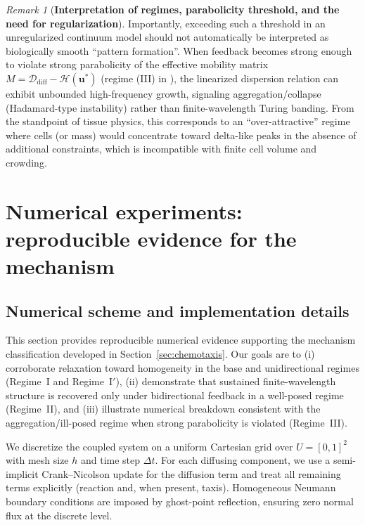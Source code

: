 \documentclass[pdflatex,sn-mathphys-ay]{sn-jnl}
\theoremstyle{thmstyleone}
\theoremstyle{definition}
\theoremstyle{remark}
\newtheorem{remark}[theorem]{Remark}
\begin{document}
\begin{remark}[\textbf{Interpretation of regimes, parabolicity threshold, and the need for regularization}]
Importantly, exceeding such a threshold in an unregularized continuum model should not automatically be interpreted as biologically smooth ``pattern formation''. 
When feedback becomes strong enough to violate strong parabolicity of the effective mobility matrix $M=\mathcal{D}_{\mathrm{diff}}-\mathcal{H}(\mathbf{u}^*)$ (regime (III) in ), the linearized dispersion relation can exhibit unbounded high-frequency growth, signaling aggregation/collapse (Hadamard-type instability) rather than finite-wavelength Turing banding. 
From the standpoint of tissue physics, this corresponds to an ``over-attractive'' regime where cells (or mass) would concentrate toward delta-like peaks in the absence of additional constraints, which is incompatible with finite cell volume and crowding.
\end{remark}

\section{Numerical experiments: reproducible evidence for the mechanism}
\label{sec:numerical}

\subsection{Numerical scheme and implementation details}
\label{subsec:numerical_scheme}

This section provides reproducible numerical evidence supporting the mechanism classification developed in Section~\ref{sec:chemotaxis}. 
Our goals are to (i) corroborate relaxation toward homogeneity in the base and unidirectional regimes (Regime~I and Regime~I$'$), 
(ii) demonstrate that sustained finite-wavelength structure is recovered only under bidirectional feedback in a well-posed regime (Regime~II), 
and (iii) illustrate numerical breakdown consistent with the aggregation/ill-posed regime when strong parabolicity is violated (Regime~III).

We discretize the coupled system on a uniform Cartesian grid over $U=[0,1]^2$ with mesh size $h$ and time step $\Delta t$. 
For each diffusing component, we use a semi-implicit Crank--Nicolson update for the diffusion term and treat all remaining terms explicitly (reaction and, when present, taxis). 
Homogeneous Neumann boundary conditions are imposed by ghost-point reflection, ensuring zero normal flux at the discrete level.
\end{document}

